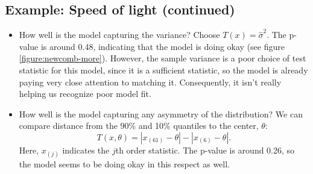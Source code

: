 \documentclass[12pt]{article}
\begin{document}
\subsection*{Example: Speed of light (continued)}
\begin{itemize}
\item How well is the model capturing the variance? Choose $T(x) = \hat \sigma^2$. The p-value is around 0.48, indicating that the model is doing okay (see figure \ref{figure:newcomb-more}).  However, the sample variance is a poor choice of test statistic for this model, since it is a sufficient statistic, so the model is already paying very close attention to matching it. Consequently, it isn't really helping us recognize poor model fit.
\item How well is the model capturing any asymmetry of the distribution? We can compare distance from the 90\% and 10\% quantiles to the center, $\theta$:
$$ T(x,\theta) = | x_{(61)} - \theta | - | x_{(6)} - \theta |. $$
Here, $x_{(j)}$ indicates the $j$th order statistic.  The p-value is around 0.26, so the model seems to be doing okay in this respect as well.
\end{itemize}
\end{document}
